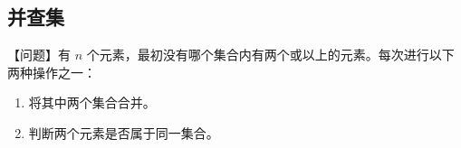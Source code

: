 \subsection{并查集}
	【问题】有 $n$ 个元素，最初没有哪个集合内有两个或以上的元素。每次进行以下两种操作之一：
	
	\begin{enumerate}
		\item 将其中两个集合合并。
		\item 判断两个元素是否属于同一集合。
	\end{enumerate}
	
	